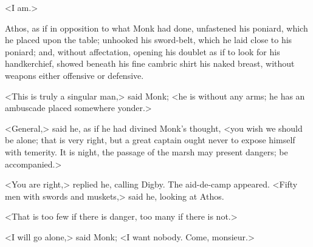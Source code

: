 <I am.>

Athos, as if in opposition to what Monk had done, unfastened his poniard, which he placed upon the table; unhooked his sword-belt, which he laid close to his poniard; and, without affectation, opening his doublet as if to look for his handkerchief, showed beneath his fine cambric shirt his naked breast, without weapons either offensive or defensive.

<This is truly a singular man,> said Monk; <he is without any arms; he has an ambuscade placed somewhere yonder.>

<General,> said he, as if he had divined Monk's thought, <you wish we should be alone; that is very right, but a great captain ought never to expose himself with temerity. It is night, the passage of the marsh may present dangers; be accompanied.>

<You are right,> replied he, calling Digby. The aid-de-camp appeared. <Fifty men with swords and muskets,> said he, looking at Athos.

<That is too few if there is danger, too many if there is not.>

<I will go alone,> said Monk; <I want nobody. Come, monsieur.> 